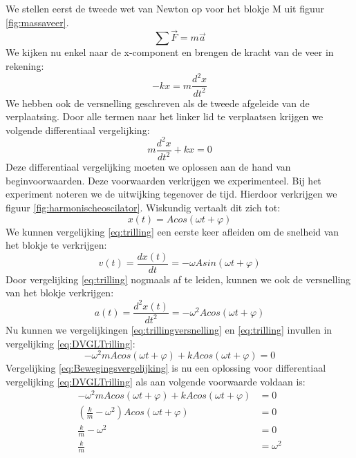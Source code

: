 \documentclass[a4paper,kul]{kulakarticle} %
\begin{document}
We stellen eerst de tweede wet van Newton op voor het blokje M uit figuur \ref{fig:massaveer}.
\begin{equation*}
	\sum \vec{F} = m\vec{a}
\end{equation*}
We kijken nu enkel naar de x-component en brengen de kracht van de veer in rekening:
\begin{equation*}
	-kx = m\frac{d^2x}{dt^2}
\end{equation*}
We hebben ook de versnelling geschreven als de tweede afgeleide van de verplaatsing. Door alle termen naar het linker lid te verplaatsen krijgen we volgende differentiaal vergelijking: 
\begin{equation}
	m\frac{d^2x}{dt^2} + kx = 0
	\label{eq:DVGLTrilling}
\end{equation}
Deze differentiaal vergelijking moeten we oplossen aan de hand van beginvoorwaarden. Deze voorwaarden verkrijgen we experimenteel. Bij het experiment noteren we de uitwijking tegenover de tijd. Hierdoor verkrijgen we figuur \ref{fig:harmonischeoscilator}.
Wiskundig vertaalt dit zich tot: 
\begin{equation}
	x(t) = A cos(\omega t + \varphi)
	\label{eq:trilling}
\end{equation}
We kunnen vergelijking \ref{eq:trilling} een eerste keer afleiden om de snelheid van het blokje te verkrijgen: 
\begin{equation}
	v(t) = \frac{dx(t)}{dt} = -\omega Asin(\omega t + \varphi)
	\label{eq:trillingsnelheid}
\end{equation}
Door vergelijking \ref{eq:trilling} nogmaals af te leiden, kunnen we ook de versnelling van het blokje verkrijgen:
\begin{equation}
	a(t) = \frac{d^2x(t)}{dt^2} = -\omega^2 Acos(\omega t + \varphi)
	\label{eq:trillingversnelling}
\end{equation}
Nu kunnen we vergelijkingen \ref{eq:trillingversnelling} en \ref{eq:trilling} invullen in vergelijking \ref{eq:DVGLTrilling}:
\begin{equation}
	-\omega^2 mAcos(\omega t + \varphi) + k A cos(\omega t + \varphi) = 0
	\label{eq:Bewegingsvergelijking}
\end{equation}
Vergelijking \ref{eq:Bewegingsvergelijking} is nu een oplossing voor differentiaal vergelijking \ref{eq:DVGLTrilling} als aan volgende voorwaarde voldaan is:
\begin{align*}
	-\omega^2 mAcos(\omega t + \varphi) + k A cos(\omega t + \varphi) & = 0\\
	(\frac{k}{m}-\omega^2)A cos(\omega t + \varphi) & = 0\\
	\frac{k}{m}-\omega^2 & = 0\\
	\frac{k}{m} & = \omega^2
\end{align*}
\end{document}
